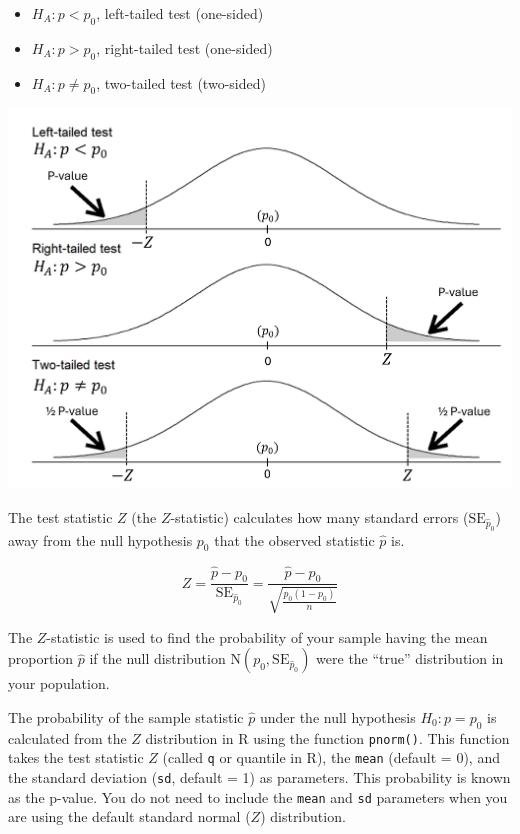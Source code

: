 \documentclass[
  letterpaper,
  DIV=11,
  numbers=noendperiod]{scrartcl}
\begin{document}
\begin{itemize}
\item
  \(H_A \colon p < p_0\), left-tailed test (one-sided)
\item
  \(H_A \colon p > p_0\), right-tailed test (one-sided)
\item
  \(H_A \colon p \ne p_0\), two-tailed test (two-sided)
\end{itemize}

\includegraphics{cheatsheet_files/mediabag/z-test.png}

The test statistic \(Z\) (the \(Z\)-statistic) calculates how many
standard errors (\(\text{SE}_{\hat{p}_0}\)) away from the null
hypothesis \(p_0\) that the observed statistic \(\hat{p}\) is.

\[
Z=\frac{\hat{p}-p_0}{\text{SE}_{\hat{p}_0}}=\frac{\hat{p}-p_0}{\sqrt{\frac{p_0(1-p_0)}{n}}}
\]

The \(Z\)-statistic is used to find the probability of your sample
having the mean proportion \(\hat{p}\) if the null distribution
\(\text{N}\left(p_0, \text{SE}_{\hat{p}_0}\right)\) were the ``true''
distribution in your population.

The probability of the sample statistic \(\hat{p}\) under the null
hypothesis \(H_0 \colon p=p_0\) is calculated from the \(Z\)
distribution in R using the function \texttt{pnorm()}. This function
takes the test statistic \(Z\) (called \texttt{q} or quantile in R), the
\texttt{mean} (default = 0), and the standard deviation (\texttt{sd},
default = 1) as parameters. This probability is known as the p-value.
You do not need to include the \texttt{mean} and \texttt{sd} parameters
when you are using the default standard normal (\(Z\)) distribution.
\end{document}
